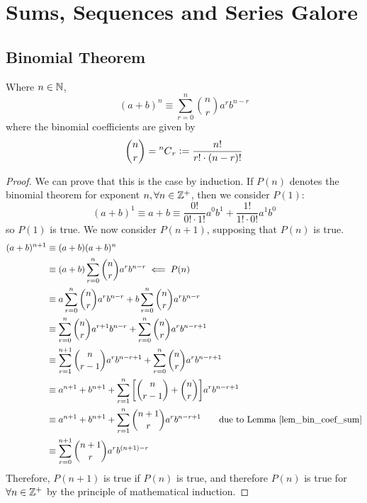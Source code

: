 \section{Sums, Sequences and Series Galore}

\subsection{Binomial Theorem}

\begin{theorem} Where \(n \in \mathbb N\),
\begin{equation*}
(a + b)^n \equiv \sum_{r = 0}^n \binom nr a^r b^{n - r}
\end{equation*}
where the binomial coefficients are given by
\begin{equation*}
\binom nr = \prescript{n\mkern-0.5mu}{}C_{r} \vcentcolon= \frac{n!}{r!\cdot(n - r)!}
\end{equation*}
\end{theorem}
\begin{proof}
We can prove that this is the case by induction. If \(P(n)\) denotes the
binomial theorem for exponent \(n, \forall n \in \mathbb Z^+\), then we
consider \(P(1)\):
\begin{equation*}
(a + b)^1 \equiv a + b
    \equiv \frac{0!}{0!\cdot 1!} a^0b^1 + \frac{1!}{1!\cdot 0!} a^1b^0
\end{equation*}
so \(P(1)\) is true. We now consider \(P(n + 1)\), supposing that \(P(n)\)
is true.
\begin{align*}
(a + b)^{n + 1} &\equiv (a + b)(a + b)^n \\
    &\equiv (a + b)\sum_{r = 0}^n \binom nr a^r b^{n - r}
        \impliedby P(n) \\
    &\equiv a\sum_{r = 0}^n \binom nr a^r b^{n - r}
          + b\sum_{r = 0}^n \binom nr a^r b^{n - r} \\
    &\equiv \sum_{r = 0}^n \binom nr a^{r + 1} b^{n - r}
          + \sum_{r = 0}^n \binom nr a^r b^{n - r + 1} \\
    &\equiv \sum_{r = 1}^{n + 1} \binom n{r - 1} a^r b^{n - r + 1}
          + \sum_{r = 0}^n \binom nr a^r b^{n - r + 1} \\
    &\equiv a^{n + 1} + b^{n + 1}
          + \sum_{r = 1}^n \bqty{\binom n{r - 1} + \binom nr}
            a^r b^{n - r + 1} \\
    &\equiv a^{n + 1} + b^{n + 1}
          + \sum_{r = 1}^n \binom{n + 1}r a^r b^{n - r + 1}
            \qquad \text{due to Lemma \ref{lem_bin_coef_sum}} \\
    &\equiv \sum_{r = 0}^{n + 1} \binom{n + 1}r a^r b^{(n + 1) - r} \\
\end{align*}
Therefore, \(P(n + 1)\) is true if \(P(n)\) is true, and therefore \(P(n)\) is
true for \(\forall n \in \mathbb Z^+\) by the principle of mathematical
induction.
\end{proof}

